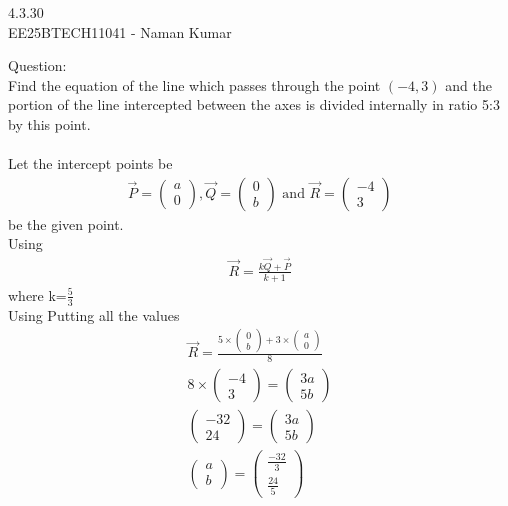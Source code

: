 \documentclass[journal]{IEEEtran}
\author{EE25BTECH11041-Naman Kumar }
\begin{document}
\begin{center}
    \huge{4.3.30}\\
    \large{EE25BTECH11041 - Naman Kumar}
\end{center}
Question:\\
Find the equation of the line which passes through the point $(-4, 3)$ and the portion of the line intercepted between the axes is divided internally in ratio 5:3 by this point.\\
\solution \\
Let the intercept points be
\begin{align}
    \vec{P}=\begin{pmatrix}a\\0\end{pmatrix},\vec{Q}=\begin{pmatrix}0\\b\end{pmatrix}\text{ and }\vec{R}=\begin{pmatrix}-4\\3\end{pmatrix}
\end{align}
be the given point.\\
Using
\begin{align}
    \vec{R}=\frac{k\vec{Q}+\vec{P}}{k+1}
\end{align}
where k=$\frac{5}{3}$\\
Using Putting all the values
\begin{align}
    \vec{R}=\frac{5\times \begin{pmatrix}0\\b\end{pmatrix}+3\times \begin{pmatrix}a\\0\end{pmatrix}}{8}\\
    8\times\begin{pmatrix}-4\\3\end{pmatrix}=\begin{pmatrix}3a\\5b\end{pmatrix}\\
    \begin{pmatrix}-32\\24\end{pmatrix}=\begin{pmatrix}3a\\5b\end{pmatrix}\\
    \begin{pmatrix}a\\b\end{pmatrix}=\begin{pmatrix}\frac{-32}{3}\\ \frac{24}{5}\end{pmatrix}
\end{align}
\end{document}
